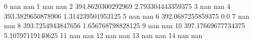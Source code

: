 0 nan nan
1 nan nan
2 394.8620300292969 2.793304443359375
3 nan nan
4 393.3829650878906 1.314239501953125
5 nan nan
6 392.0687255859375 0.0
7 nan nan
8 393.7254943847656 1.656768798828125
9 nan nan
10 397.17669677734375 5.10797119140625
11 nan nan
12 nan nan
13 nan nan
14 nan nan
